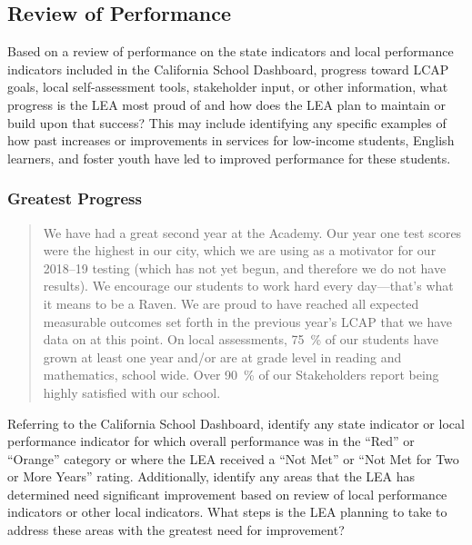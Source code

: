 \documentclass{article}
\newcounter{goal}[section]
\begin{document}
\subsection{Review of Performance}

Based on a review of performance on the state indicators and local performance indicators included in the California School Dashboard, progress toward LCAP goals, local self-assessment tools, stakeholder input, or other information, what progress is the LEA most proud of and how does the LEA plan to maintain or build upon that success? This may include identifying any specific examples of how past increases or improvements in services for low-income students, English learners, and foster youth have led to improved performance for these students.
\subsubsection{Greatest Progress}
\begin{quote}	
	We have had a great second year at the Academy. Our year one test scores were the highest in our city, which we are using as a motivator for our 2018--19 testing (which has not yet begun, and therefore we do not have results). We encourage our students to work hard every day---that's what it means to be a Raven. We are proud to have reached all expected measurable outcomes set forth in the previous year's LCAP that we have data on at this point. On local assessments, \SI{75}{\percent} of our students have grown at least one year and/or are at grade level in reading and mathematics, school wide. Over \SI{90}{\percent} of our Stakeholders report being highly satisfied with our school.
\end{quote}

Referring to the California School Dashboard, identify any state indicator or local performance indicator for which overall performance was in the ``Red'' or ``Orange'' category or where the LEA received a ``Not Met'' or ``Not Met for Two or More Years'' rating. Additionally, identify any areas that the LEA has determined need significant improvement based on review of local performance indicators or other local indicators. What steps is the LEA planning to take to address these areas with the greatest need for improvement?
\end{document}
